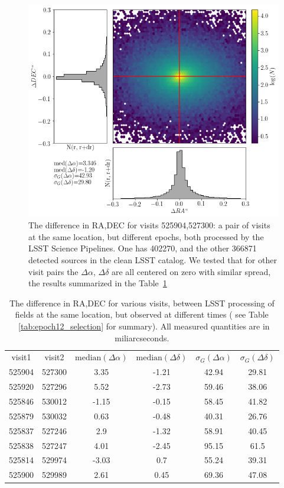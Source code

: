\documentclass[DM,lsstdraft,toc,usenatbib]{lsstdoc}
\begin{document}
\begin{figure}
\begin{centering}
\includegraphics[width=0.8\columnwidth]{figs/23_lsst525904-527300_RA_DEC_offset.png}
\caption{The difference in RA,DEC for visits 525904,527300: a pair of visits at the same location, but different epochs, both processed by the LSST Science Pipelines. One has 402270, and the other 366871 detected sources in  the clean LSST catalog. We tested that for other visit pairs the $\Delta \alpha$, $\Delta \delta$ are all centered on zero with similar spread, the results summarized in the Table~\ref{tab:radec_lsst_lsst}}
\label{fig:ra_dec_lsst_lsst}
\end{centering}
\end{figure} 


\begin{table}
\centering
\caption{The difference in RA,DEC for various visits, between LSST processing of fields at the same location, but observed at different times ( see Table ~\ref{tab:epoch12_selection} for summary). All  measured quantities are in miliarcseconds. }
\label{tab:radec_lsst_lsst}
\begin{tabular}{cccccc}
visit1 & visit2 & $\mathrm{median}(\Delta\alpha)$ & $\mathrm{median}(\Delta\delta)$ & $\sigma_{G}(\Delta\alpha)$ & $\sigma_{G}(\Delta\delta)$ \\
525904 & 527300 & 3.35 & -1.21 & 42.94 & 29.81 \\
525920 & 527296 & 5.52 & -2.73 & 59.46 & 38.06 \\
525846 & 530012 & -1.15 & -0.15 & 58.45 & 41.82 \\
525879 & 530032 & 0.63 & -0.48 & 40.31 & 26.76 \\
525837 & 527246 & 2.9 & -1.32 & 58.91 & 40.45 \\
525838 & 527247 & 4.01 & -2.45 & 95.15 & 61.5 \\
525814 & 529974 & -3.03 & 0.7 & 55.24 & 39.31 \\
525900 & 529989 & 2.61 & 0.45 & 69.36 & 47.08 \\
\end{tabular}
\end{table}
\end{document}

